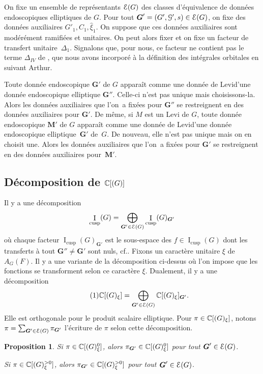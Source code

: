\documentclass[11pt]{article}
\newcommand{\cf}{cf.\xspace}
\newcommand{\skpt}{\smallskip}
\numberwithin{equation}{section}\providecommand{\og}{«\,}\providecommand{\fg}{\,»}
\let\mathcal \EuScript
\let\oldenumerate\enumerate
\renewcommand{\enumerate}{\oldenumerate\itemindent0pt}
\newenvironment{enumeratei}
{\bgroup\def\theenumi{\roman{enumi}}\def\theenumii{\arabic{enumii}}\oldenumerate}
{\endenumerate\egroup}
\newcommand{\NoChangel}[1]{%
\expandafter\let\csname old\string#1\endcsname=#1
\let#1=\relax
\newcommand{#1}{\mathcode`l="716C\csname old\string#1\endcsname\mathcode`l="7160 }%
}
\newcommand{\cusp}{\mathrm{cusp}}
\newcommand{\Ell}{\mathrm{Ell}} \NoChangel{\Ell}
\DeclareMathOperator{\rI}{I}
\newcommand{\bG}{\boldsymbol{G}}
\newcommand{\bM}{\boldsymbol{M}}
\newcommand{\cE}{\mathcal{E}}
\newcommand{\cG}{\mathcal{G}}
\newcommand{\CC}{\mathbb{C}}
\theoremstyle{plain}
\newtheorem*{prop*}{Proposition}
\theoremstyle{definition}
\begin{document}
On fixe un ensemble de représentants $\cE(G)$ des classes d'équivalence de données endoscopiques elliptiques de $G$.
Pour tout $\bG'=(G',\cG',s)\in \cE(G)$, on fixe des données auxiliaires $G'_{1},C_{1},\hat{\xi}_{1}$.
On suppose que ces données auxiliaires sont modérément ramifiées et unitaires. On peut alors fixer et on fixe un facteur de transfert unitaire~$\Delta_{1}$. Signalons que, pour nous, ce facteur ne contient pas le terme $\Delta_{\textit{IV}}$ de \cite{LS}, que nous avons incorporé à la définition des intégrales orbitales en suivant Arthur.

Toute donnée endoscopique $\bG'$ de $G$ apparaît comme une \og donnée de Levi\fg d'une donnée endoscopique elliptique $\bG''$. Celle-ci n'est pas unique mais choisissons-la. Alors les données auxiliaires que l'on~a fixées pour $\bG''$ se restreignent en des données auxiliaires pour $\bG'$. De même, si $M$ est un Levi de $G$, toute donnée endoscopique $\bM'$ de $G$ apparaît comme une \og donnée de Levi\fg d'une donnée endoscopique elliptique~$\bG'$ de~$G$. De nouveau, elle n'est pas unique mais on en choisit une. Alors les données auxiliaires que l'on~a fixées pour $\bG'$ se restreignent en des données auxiliaires pour~$\bM'$.

\subsection{Décomposition de \texorpdfstring{$\CC[\Ell(G)]$}{CLG}}\label{decomposition}

Il y a une décomposition
\[
\rI_{\cusp}(G)=\bigoplus_{\bG'\in\cE(G)}\rI_{\cusp}(G)_{\bG'}
\]
où chaque facteur $\rI_{\cusp}(G)_{\bG'}$ est le sous-espace des $f\in \rI_{\cusp}(G)$ dont les transferts à tout $\bG''\neq\bG'$ sont nuls, \cf \cite[Prop.\,I.4.11]{MW}. Fixons un caractère unitaire $\xi$ de $A_{G}(F)$. Il y a une variante de la décomposition ci-dessus où l'on impose que les fonctions se transforment selon ce caractère $\xi$. Dualement, il y a une décomposition
\begin{equation}\tag{1}\label{decomposition1}
\CC[\Ell(G)_{\xi}]=\bigoplus_{\bG'\in\cE(G)}\CC[\Ell(G)_{\xi}]_{\bG'}.
\end{equation}
Elle est orthogonale pour le produit scalaire elliptique. Pour $\pi\in \CC[\Ell(G)_{\xi}]$, notons $\pi=\sum_{\bG'\in \cE(G)}\pi_{\bG'}$ l'écriture de $\pi$ selon cette décomposition.

\skpt
\begin{prop*}
\begin{enumeratei}
\item\label{decompositioni}
Si $\pi\in \CC[\Ell(G)^0_{\xi}]$, alors $\pi_{\bG'}\in \CC[\Ell(G)^0_{\xi}]$ pour tout $\bG'\in \cE(G)$.

\item\label{decompositionii}
Si $\pi\in \CC[\Ell(G)^{>0}_{\xi}]$, alors $\pi_{\bG'}\in \CC[\Ell(G)^{>0}_{\xi}]$ pour tout $\bG'\in \cE(G)$.
\end{enumeratei}
\end{prop*}
\end{document}
